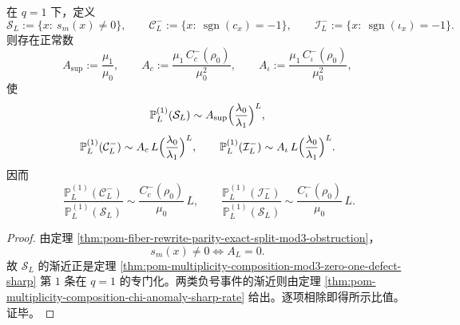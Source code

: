 \begin{corollary}\label{cor:pom-multiplicity-composition-chi-vs-supersym}
在 \(q=1\) 下，定义
\[
\mathcal S_L:=\{x:\ s_m(x)\neq 0\},
\qquad
\mathcal C_L^-:=\{x:\ \operatorname{sgn}(c_x)=-1\},
\qquad
\mathcal I_L^-:=\{x:\ \operatorname{sgn}(\iota_x)=-1\}.
\]
则存在正常数
\[
A_{\mathrm{sup}}:=\frac{\mu_1}{\mu_0},
\qquad
A_c:=\frac{\mu_1\,C_c^-(\rho_0)}{\mu_0^2},
\qquad
A_\iota:=\frac{\mu_1\,C_\iota^-(\rho_0)}{\mu_0^2},
\]
使
\[
\mathbb P_L^{(1)}(\mathcal S_L)\sim
A_{\mathrm{sup}}\Bigl(\frac{\lambda_0}{\lambda_1}\Bigr)^L,
\]
\[
\mathbb P_L^{(1)}(\mathcal C_L^-)\sim
A_c\,L\Bigl(\frac{\lambda_0}{\lambda_1}\Bigr)^L,
\qquad
\mathbb P_L^{(1)}(\mathcal I_L^-)\sim
A_\iota\,L\Bigl(\frac{\lambda_0}{\lambda_1}\Bigr)^L.
\]
因而
\[
\boxed{\;
\frac{\mathbb P_L^{(1)}(\mathcal C_L^-)}{\mathbb P_L^{(1)}(\mathcal S_L)}
\sim
\frac{C_c^-(\rho_0)}{\mu_0}\,L,
\qquad
\frac{\mathbb P_L^{(1)}(\mathcal I_L^-)}{\mathbb P_L^{(1)}(\mathcal S_L)}
\sim
\frac{C_\iota^-(\rho_0)}{\mu_0}\,L.}
\]
\end{corollary}
\begin{proof}
由定理 \ref{thm:pom-fiber-rewrite-parity-exact-split-mod3-obstruction}，
\[
s_m(x)\neq 0
\iff
A_L=0.
\]
故 \(\mathcal S_L\) 的渐近正是定理 \ref{thm:pom-multiplicity-composition-mod3-zero-one-defect-sharp} 第 \(1\) 条在 \(q=1\) 的专门化。两类负号事件的渐近则由定理 \ref{thm:pom-multiplicity-composition-chi-anomaly-sharp-rate} 给出。逐项相除即得所示比值。证毕。
\end{proof}

\endinput
